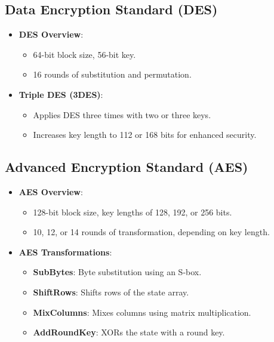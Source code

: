 \documentclass[12pt]{article}
\begin{document}
\subsection{Data Encryption Standard (DES)}
\begin{itemize}
    \item \textbf{DES Overview}:
    \begin{itemize}
        \item 64-bit block size, 56-bit key.
        \item 16 rounds of substitution and permutation.
    \end{itemize}
    \item \textbf{Triple DES (3DES)}:
    \begin{itemize}
        \item Applies DES three times with two or three keys.
        \item Increases key length to 112 or 168 bits for enhanced security.
    \end{itemize}
\end{itemize}

\subsection{Advanced Encryption Standard (AES)}
\begin{itemize}
    \item \textbf{AES Overview}:
    \begin{itemize}
        \item 128-bit block size, key lengths of 128, 192, or 256 bits.
        \item 10, 12, or 14 rounds of transformation, depending on key length.
    \end{itemize}
    \item \textbf{AES Transformations}:
    \begin{itemize}
        \item \textbf{SubBytes}: Byte substitution using an S-box.
        \item \textbf{ShiftRows}: Shifts rows of the state array.
        \item \textbf{MixColumns}: Mixes columns using matrix multiplication.
        \item \textbf{AddRoundKey}: XORs the state with a round key.
    \end{itemize}
\end{itemize}
\end{document}
